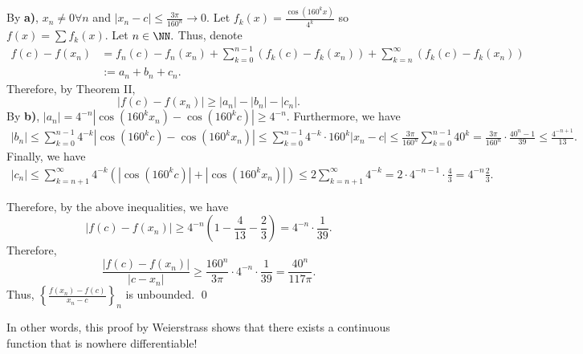 By \textbf{a)}, $x_n\neq 0 \forall n$ and $|x_n-c| \leq \frac{3\pi}{160^n}\to 0$. Let $f_k(x) = \frac{\cos(160^k x)}{4^k}$ so $f(x) = \sum f_k(x)$. Let $n\in \NN.$ Thus, denote
\begin{align*}
    f(c) - f(x_n) &= f_n(c) - f_n(x_n) + \sum_{k=0}^{n-1} (f_k(c) - f_k(x_n)) + \sum_{k=n}^{\infty} (f_k(c) - f_k(x_n)) \\
    &:= a_n + b_n + c_n.
\end{align*}
Therefore, by Theorem II,
\[
|f(c) - f(x_n)| \geq |a_n| - |b_n| -|c_n|.
\]
By \textbf{b)}, $|a_n| = 4^{-n}|\cos(160^kx_n) - \cos(160^k c)| \geq 4^{-n}$.
Furthermore, we have 
\begin{align*}
    |b_n| \leq \sum_{k=0}^{n-1} 4^{-k} |\cos (160^k c) -\cos (160^k x_n)|
    \leq \sum_{k=0}^{n-1} 4^{-k} \cdot 160^k |x_n-c| 
    \leq \frac{3\pi}{160^n} \sum_{k=0}^{n-1} 40^k 
    = \frac{3\pi}{160^n}\cdot  \frac{40^n - 1}{39} 
    \leq \frac{4^{-n+1}}{13}.
\end{align*}
Finally, we have 
\begin{align*}
    |c_n| \leq \sum_{k=n+1}^\infty 4^{-k}(|\cos(160^k c)| + |\cos(160^k x_n)|)
    \leq 2\sum_{k=n+1}^\infty 4^{-k}
    = 2\cdot 4^{-n-1}\cdot \frac{4}{3} = 4^{-n} \frac{2}{3}.
\end{align*}

Therefore, by the above inequalities, we have 
\[
|f(c) - f(x_n)| \geq 4^{-n}\left(1-\frac{4}{13} - \frac{2}{3}\right) = 4^{-n}\cdot \frac{1}{39}.
\]
Therefore, 
\[
\frac{|f(c)-f(x_n)|}{|c-x_n|} \geq \frac{160^n}{3\pi}\cdot 4^{-n}\cdot \frac{1}{39} = \frac{40^n}{117\pi}.
\]
Thus, $\left\{\frac{f(x_n)-f(c)}{x_n-c}\right\}_n$ is unbounded. \qed 

\begin{remark}
In other words, this proof by Weierstrass shows that there exists a continuous function that is nowhere differentiable!
\end{remark}


